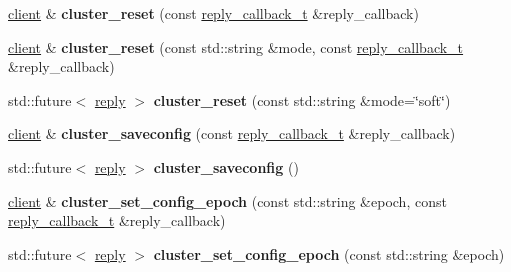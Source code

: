 \begin{DoxyCompactItemize}
\mbox{\label{classcpp__redis_1_1client_a99c86f1931c92594f2c14ac34b3d5dfd}} 
\mbox{\hyperlink{classcpp__redis_1_1client}{client}} \& {\bfseries cluster\+\_\+reset} (const \mbox{\hyperlink{classcpp__redis_1_1client_af7a65eb21aa25230bfbb0b0203c4fc04}{reply\+\_\+callback\+\_\+t}} \&reply\+\_\+callback)
\item 
\mbox{\label{classcpp__redis_1_1client_a3f039634232d14d4eec6fea27784a347}} 
\mbox{\hyperlink{classcpp__redis_1_1client}{client}} \& {\bfseries cluster\+\_\+reset} (const std\+::string \&mode, const \mbox{\hyperlink{classcpp__redis_1_1client_af7a65eb21aa25230bfbb0b0203c4fc04}{reply\+\_\+callback\+\_\+t}} \&reply\+\_\+callback)
\item 
\mbox{\label{classcpp__redis_1_1client_ac49706b4ea17538653a6e5a77791ae31}} 
std\+::future$<$ \mbox{\hyperlink{classcpp__redis_1_1reply}{reply}} $>$ {\bfseries cluster\+\_\+reset} (const std\+::string \&mode=\char`\"{}soft\char`\"{})
\item 
\mbox{\label{classcpp__redis_1_1client_a2860dbeb1f7acd44e72e3ad02fc16e20}} 
\mbox{\hyperlink{classcpp__redis_1_1client}{client}} \& {\bfseries cluster\+\_\+saveconfig} (const \mbox{\hyperlink{classcpp__redis_1_1client_af7a65eb21aa25230bfbb0b0203c4fc04}{reply\+\_\+callback\+\_\+t}} \&reply\+\_\+callback)
\item 
\mbox{\label{classcpp__redis_1_1client_a5b8571b48e9e56fad203a04dd50559be}} 
std\+::future$<$ \mbox{\hyperlink{classcpp__redis_1_1reply}{reply}} $>$ {\bfseries cluster\+\_\+saveconfig} ()
\item 
\mbox{\label{classcpp__redis_1_1client_ac930f6544459b0b2476f741beb6a2508}} 
\mbox{\hyperlink{classcpp__redis_1_1client}{client}} \& {\bfseries cluster\+\_\+set\+\_\+config\+\_\+epoch} (const std\+::string \&epoch, const \mbox{\hyperlink{classcpp__redis_1_1client_af7a65eb21aa25230bfbb0b0203c4fc04}{reply\+\_\+callback\+\_\+t}} \&reply\+\_\+callback)
\item 
\mbox{\label{classcpp__redis_1_1client_a0be11e04ce58a13e2e40272be1fad788}} 
std\+::future$<$ \mbox{\hyperlink{classcpp__redis_1_1reply}{reply}} $>$ {\bfseries cluster\+\_\+set\+\_\+config\+\_\+epoch} (const std\+::string \&epoch)

\end{DoxyCompactItemize}
